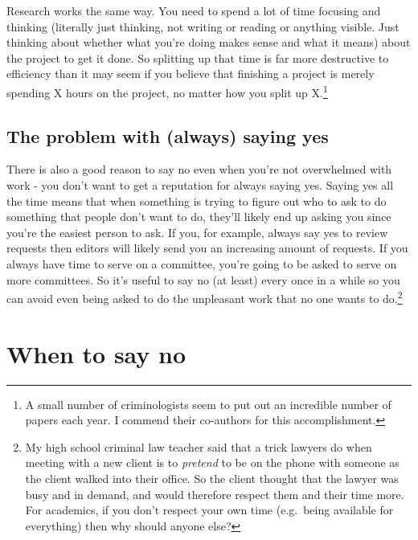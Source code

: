 \documentclass[
  12pt,
]{book}
\begin{document}
Research works the same way. You need to spend a lot of time focusing and thinking (literally just thinking, not writing or reading or anything visible. Just thinking about whether what you're doing makes sense and what it means) about the project to get it done. So splitting up that time is far more destructive to efficiency than it may seem if you believe that finishing a project is merely spending X hours on the project, no matter how you split up X.\footnote{A small number of criminologists seem to put out an incredible number of papers each year. I commend their co-authors for this accomplishment.}

\hypertarget{the-problem-with-always-saying-yes}{%
\subsection{The problem with (always) saying yes}\label{the-problem-with-always-saying-yes}}

There is also a good reason to say no even when you're not overwhelmed with work - you don't want to get a reputation for always saying yes. Saying yes all the time means that when something is trying to figure out who to ask to do something that people don't want to do, they'll likely end up asking you since you're the easiest person to ask. If you, for example, always say yes to review requests then editors will likely send you an increasing amount of requests. If you always have time to serve on a committee, you're going to be asked to serve on more committees. So it's useful to say no (at least) every once in a while so you can avoid even being asked to do the unpleasant work that no one wants to do.\footnote{My high school criminal law teacher said that a trick lawyers do when meeting with a new client is to \emph{pretend} to be on the phone with someone as the client walked into their office. So the client thought that the lawyer was busy and in demand, and would therefore respect them and their time more. For academics, if you don't respect your own time (e.g.~being available for everything) then why should anyone else?}

\hypertarget{when-to-say-no}{%
\section{When to say no}\label{when-to-say-no}}
\end{document}
